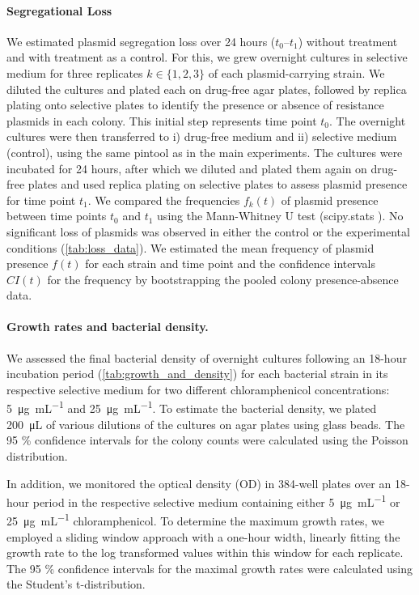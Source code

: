 \paragraph{Segregational Loss}
We estimated plasmid segregation loss over 24 hours ($t_0$--$t_1$) without treatment and with treatment as a control. 
For this, we grew overnight cultures in selective medium for three replicates $k \in \{1, 2, 3\}$ of each plasmid-carrying strain. 
We diluted the cultures and plated each on drug-free agar plates, followed by replica plating onto selective plates to identify the presence or absence of resistance plasmids in each colony. 
This initial step represents time point $t_0$.
The overnight cultures were then transferred to i) drug-free medium and ii) selective medium (control), using the same pintool as in the main experiments. 
The cultures were incubated for 24 hours, after which we diluted and plated them again on drug-free plates and used replica plating on selective plates to assess plasmid presence for time point $t_1$.
We compared the frequencies $f_k(t)$ of plasmid presence between time points $t_0$ and $t_1$ using the Mann-Whitney U test (scipy.stats \cite{Virtanen2020}).
No significant loss of plasmids was observed in either the control or the experimental conditions (\autoref{tab:loss_data}).
We estimated the mean frequency of plasmid presence $f(t)$  for each strain and time point and the confidence intervals $CI(t)$ for the frequency by bootstrapping the pooled colony presence-absence data.

\paragraph{Growth rates and bacterial density.}
We assessed the final bacterial density of overnight cultures following an 18-hour incubation period (\autoref{tab:growth_and_density}) for each bacterial strain in its respective selective medium for two different chloramphenicol concentrations: \SI{5}{\micro\gram\per\milli\liter} and \SI{25}{\micro\gram\per\milli\liter}. 
To estimate the bacterial density, we plated \SI{200}{\micro\liter} of various dilutions of the cultures on agar plates using glass beads. 
The 95 \% confidence intervals for the colony counts were calculated using the Poisson distribution.

In addition, we monitored the optical density (OD) in 384-well plates over an 18-hour period in the respective selective medium containing either \SI{5}{\micro\gram\per\milli\liter} or \SI{25}{\micro\gram\per\milli\liter} chloramphenicol. To determine the maximum growth rates, we employed a sliding window approach with a one-hour width, linearly fitting the growth rate to the log transformed values within this window for each replicate. 
The 95 \% confidence intervals for the maximal growth rates were calculated using the Student's t-distribution.

